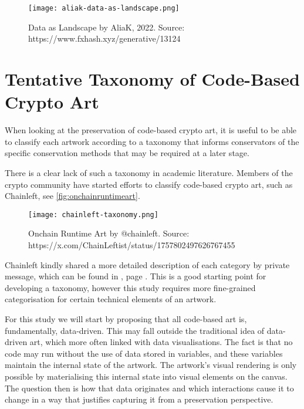 \begin{figure}[h]
    \centering
    \captionsetup{justification=centering}
    \texttt{[image: aliak-data-as-landscape.png]}
    \caption[Data as Landscape by AliaK]{Data as Landscape by AliaK, 2022. Source: https://www.fxhash.xyz/generative/13124}
    \label{fig:aliak-data-as-landscape}
\end{figure}



\section{Tentative Taxonomy of Code-Based Crypto Art}
\label{sec:interactivity}

When looking at the preservation of code-based crypto art, it is useful to be able to classify each artwork according to a taxonomy that informs conservators of the specific conservation methods that may be required at a later stage.

There is a clear lack of such a taxonomy in academic literature. Members of the crypto community have started efforts to classify code-based crypto art, such as Chainleft, see \autoref{fig:onchainruntimeart}.

\begin{figure}[h]
    \centering
    \captionsetup{justification=centering}
    \texttt{[image: chainleft-taxonomy.png]}
    \caption[Onchain Runtime Art]{Onchain Runtime Art by @chainleft. Source: https://x.com/ChainLeftist/status/1757802497626767455}
    \label{fig:onchainruntimeart}
\end{figure}

Chainleft kindly shared a more detailed description of each category by private message, which can be found in , page \pageref{appx:chainleft-taxonomy}. This is a good starting point for developing a taxonomy, however this study requires more fine-grained categorisation for certain technical elements of an artwork. 

For this study we will start by proposing that all code-based art is, fundamentally, data-driven. This may fall outside the traditional idea of data-driven art, which more often linked with data visualisations. The fact is that no code may run without the use of data stored in variables, and these variables maintain the internal state of the artwork. The artwork's visual rendering is only possible by materialising this internal state into visual elements on the canvas. The question then is how that data originates and which interactions cause it to change in a way that justifies capturing it from a preservation perspective.


